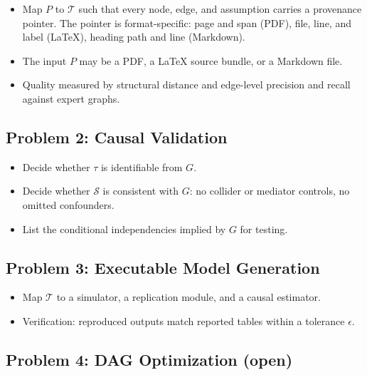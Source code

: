   \begin{itemize}
  \tightlist
  \item
    Map \(P\) to \(\mathcal{T}\) such that every node, edge, and
    assumption carries a provenance pointer. The pointer is
    format-specific: page and span (PDF), file, line, and label (LaTeX),
    heading path and line (Markdown).
  \item
    The input \(P\) may be a PDF, a LaTeX source bundle, or a Markdown
    file.
  \item
    Quality measured by structural distance and edge-level precision and
    recall against expert graphs.
  \end{itemize}

  \subsection{Problem 2: Causal
  Validation}\label{sec:problem_2_causal_validation}

  \begin{itemize}
  \tightlist
  \item
    Decide whether \(\tau\) is identifiable from \(G\).
  \item
    Decide whether \(\mathcal{S}\) is consistent with \(G\): no collider
    or mediator controls, no omitted confounders.
  \item
    List the conditional independencies implied by \(G\) for testing.
  \end{itemize}

  \subsection{Problem 3: Executable Model
  Generation}\label{sec:problem_3_executable_model_generation}

  \begin{itemize}
  \tightlist
  \item
    Map \(\mathcal{T}\) to a simulator, a replication module, and a causal
    estimator.
  \item
    Verification: reproduced outputs match reported tables within a
    tolerance \(\epsilon\).
  \end{itemize}

  \subsection{Problem 4: DAG Optimization
  (open)}\label{sec:problem_4_dag_optimization_open}

